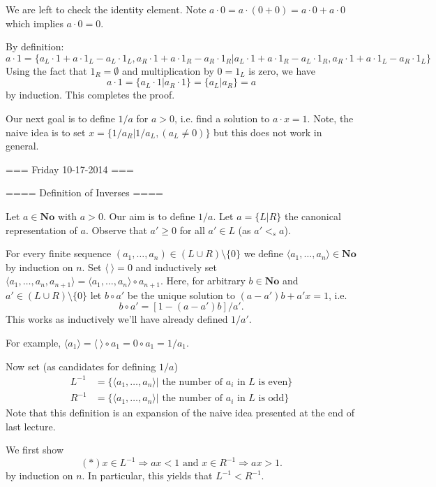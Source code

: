 We are left to check the identity element. Note $a\cdot 0 = a\cdot (0+0) = a\cdot 0 + a\cdot 0$ which implies $a\cdot 0 = 0$.

By definition:
\[
a\cdot 1 = \{a_L\cdot 1 + a\cdot 1_L - a_L\cdot 1_L, a_R\cdot 1 + a\cdot 1_R - a_R\cdot 1_R | a_L\cdot 1 + a \cdot 1_R - a_L\cdot 1_R, a_R \cdot 1 + a\cdot 1_L - a_R\cdot 1_L\}
\]
Using the fact that $1_R = \emptyset$ and multiplication by $0 = 1_L$ is zero, we have
\[
a\cdot 1 = \{a_L\cdot 1 | a_R \cdot 1\} = \{a_L | a_R\} = a
\]
by induction. This completes the proof.

Our next goal is to define $1/a$ for $a>0$, i.e. find a solution to $a\cdot x = 1$.
Note, the naive idea is to set $x = \{1/a_R | 1/a_L, (a_L\neq 0)\}$ but this does not work in general.

=== Friday 10-17-2014 ===

==== Definition of Inverses ====

Let $a\in \mathbf{No}$ with $a>0$. Our aim is to define $1/a$. Let $a = \{L|R\}$ the canonical representation of $a$. Observe that $a'\geq 0$ for all $a'\in L$ (as $a' <_s a$).

For every finite sequence $(a_1,\ldots,a_n)\in (L\cup R)\setminus \{0\}$ we define $\langle a_1,\ldots, a_n\rangle \in \mathbf{No}$ by induction on $n$. Set $\langle \ \rangle = 0$ and inductively set $\langle a_1,\ldots, a_n, a_{n+1}\rangle = \langle a_1,\ldots, a_n \rangle \circ a_{n+1}$.
Here, for arbitrary $b\in \mathbf{No}$ and $a'\in (L\cup R)\setminus \{0\}$ let $b\circ a'$ be the unique solution to $(a-a')b + a'x = 1$, i.e.
\[
b\circ a' = [1-(a-a')b]/a'.
\]
This works as inductively we'll have already defined $1/a'$.

For example, $\langle a_1 \rangle = \langle \ \rangle \circ a_1 = 0 \circ a_1 = 1/a_1$.

Now set (as candidates for defining $1/a$)
\begin{align*}
L^{-1} &= \{ \langle a_1,\ldots, a_n \rangle | \text{ the number of } a_i \text{ in }L \text{ is even} \} \\
R^{-1} &= \{ \langle a_1,\ldots, a_n \rangle | \text{ the number of } a_i \text{ in }L \text{ is odd} \}
\end{align*}
Note that this definition is an expansion of the naive idea presented at the end of last lecture.

We first show
\[
(*) x \in L^{-1} \Rightarrow ax < 1 \text{ and } x\in R^{-1} \Rightarrow ax > 1.
\]
by induction on $n$. In particular, this yields that $L^{-1} < R^{-1}$.


